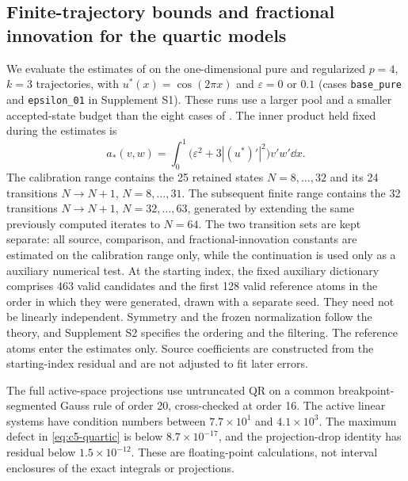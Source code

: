 \subsection{Finite-trajectory bounds and fractional innovation for the quartic models}
\label{sec:finite-trajectory-numerics}
\label{sec:fractional-innovation-p4}

We evaluate the estimates of  on the one-dimensional pure and
regularized \(p=4\), \(k=3\) trajectories, with \(u^*(x)=\cos(2\pi x)\) and
\(\varepsilon=0\) or \(0.1\) (cases \texttt{base\_pure} and \texttt{epsilon\_01}
in Supplement S1). These runs use a larger pool and a smaller accepted-state budget than the
eight cases of . The inner product held fixed during the estimates is
\[
 a_*(v,w)=\int_0^1\big(\varepsilon^2+3|(u^*)'|^2\big)v'w'\dd x.
\]
The calibration range contains the 25 retained states \(N=8,\ldots,32\) and its 24 transitions
\(N\to N+1\), \(N=8,\ldots,31\).  The subsequent finite range contains the 32 transitions
\(N\to N+1\), \(N=32,\ldots,63\), generated by extending the same previously computed iterates to \(N=64\).
The two transition sets are kept separate: all source, comparison, and fractional-innovation
constants are estimated on the calibration range only, while the continuation is used only as a
auxiliary numerical test.
At the starting index, the fixed auxiliary dictionary comprises 463 valid candidates and the first 128
valid reference atoms in the order in which they were generated, drawn with a separate seed. They
need not be linearly independent. Symmetry and the frozen normalization follow the theory, and
Supplement S2 specifies the ordering and the filtering. The reference atoms enter the estimates
only. Source coefficients are constructed from the starting-index residual and are not adjusted to fit
later errors.

The full active-space projections use untruncated QR on a common breakpoint-segmented Gauss
rule of order 20, cross-checked at order 16. The active linear systems have condition numbers
between \(7.7\times10^1\) and \(4.1\times10^3\). The maximum defect in
\cref{eq:c5-quartic} is below \(8.7\times10^{-17}\), and the projection-drop identity
has residual below \(1.5\times10^{-12}\). These are floating-point calculations, not interval
enclosures of the exact integrals or projections.

